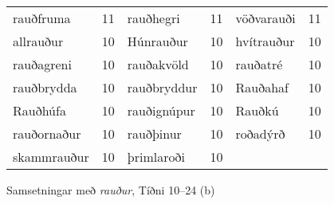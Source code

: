 \documentclass[../samsetningasafn.tex]{subfiles}
\begin{document}
\begin{wordlist}[H]
\begin{tcolorbox}

	\setlength{\extrarowheight}{3pt}
	\begin{tabular}{BlBlBl}		
		rauðfruma		& 11		& 	
		rauðhegri		& 11		& 	
		vöðvarauði		& 11		\\ 	
		allrauður			& 10		& 	
		Húnrauður		& 10		& 	
		hvítrauður		& 10		\\ 	
		rauðagreni		& 10		& 	
		rauðakvöld		& 10		& 
		rauðatré			& 10		\\ 
		rauðbrydda		& 10		& 	
		rauðbryddur		& 10		& 
		Rauðahaf		& 10		\\ 
		Rauðhúfa		& 10		& 
		rauðignúpur		& 10		& 
		Rauðkú			& 10		\\ 
		rauðornaður		& 10		& 
		rauðþinur		& 10		& 
		roðadýrð		& 10		\\ 
		skammrauður	& 10		& 
		þrimlaroði		&  10		& 
						&
	\end{tabular}

\end{tcolorbox}
	\caption{Samsetningar með \textit{rauður}, Tíðni 10--24 (b)}
	\label{listi:rautt.10b}
\end{wordlist}	
\end{document}
